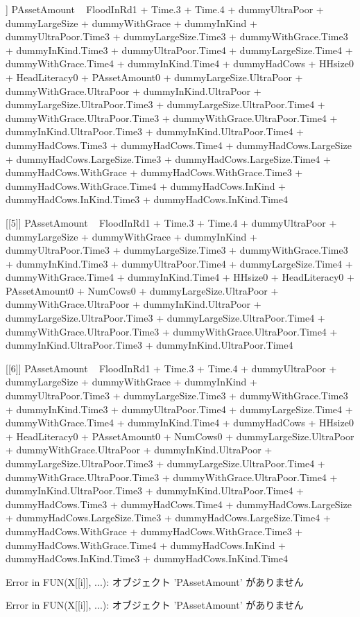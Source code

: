 \begin{Schunk}
\begin{Soutput}
[[4]]
PAssetAmount ~ FloodInRd1 + Time.3 + Time.4 + dummyUltraPoor + 
    dummyLargeSize + dummyWithGrace + dummyInKind + dummyUltraPoor.Time3 + 
    dummyLargeSize.Time3 + dummyWithGrace.Time3 + dummyInKind.Time3 + 
    dummyUltraPoor.Time4 + dummyLargeSize.Time4 + dummyWithGrace.Time4 + 
    dummyInKind.Time4 + dummyHadCows + HHsize0 + HeadLiteracy0 + 
    PAssetAmount0 + dummyLargeSize.UltraPoor + dummyWithGrace.UltraPoor + 
    dummyInKind.UltraPoor + dummyLargeSize.UltraPoor.Time3 + 
    dummyLargeSize.UltraPoor.Time4 + dummyWithGrace.UltraPoor.Time3 + 
    dummyWithGrace.UltraPoor.Time4 + dummyInKind.UltraPoor.Time3 + 
    dummyInKind.UltraPoor.Time4 + dummyHadCows.Time3 + dummyHadCows.Time4 + 
    dummyHadCows.LargeSize + dummyHadCows.LargeSize.Time3 + dummyHadCows.LargeSize.Time4 + 
    dummyHadCows.WithGrace + dummyHadCows.WithGrace.Time3 + dummyHadCows.WithGrace.Time4 + 
    dummyHadCows.InKind + dummyHadCows.InKind.Time3 + dummyHadCows.InKind.Time4

[[5]]
PAssetAmount ~ FloodInRd1 + Time.3 + Time.4 + dummyUltraPoor + 
    dummyLargeSize + dummyWithGrace + dummyInKind + dummyUltraPoor.Time3 + 
    dummyLargeSize.Time3 + dummyWithGrace.Time3 + dummyInKind.Time3 + 
    dummyUltraPoor.Time4 + dummyLargeSize.Time4 + dummyWithGrace.Time4 + 
    dummyInKind.Time4 + HHsize0 + HeadLiteracy0 + PAssetAmount0 + 
    NumCows0 + dummyLargeSize.UltraPoor + dummyWithGrace.UltraPoor + 
    dummyInKind.UltraPoor + dummyLargeSize.UltraPoor.Time3 + 
    dummyLargeSize.UltraPoor.Time4 + dummyWithGrace.UltraPoor.Time3 + 
    dummyWithGrace.UltraPoor.Time4 + dummyInKind.UltraPoor.Time3 + 
    dummyInKind.UltraPoor.Time4

[[6]]
PAssetAmount ~ FloodInRd1 + Time.3 + Time.4 + dummyUltraPoor + 
    dummyLargeSize + dummyWithGrace + dummyInKind + dummyUltraPoor.Time3 + 
    dummyLargeSize.Time3 + dummyWithGrace.Time3 + dummyInKind.Time3 + 
    dummyUltraPoor.Time4 + dummyLargeSize.Time4 + dummyWithGrace.Time4 + 
    dummyInKind.Time4 + dummyHadCows + HHsize0 + HeadLiteracy0 + 
    PAssetAmount0 + NumCows0 + dummyLargeSize.UltraPoor + dummyWithGrace.UltraPoor + 
    dummyInKind.UltraPoor + dummyLargeSize.UltraPoor.Time3 + 
    dummyLargeSize.UltraPoor.Time4 + dummyWithGrace.UltraPoor.Time3 + 
    dummyWithGrace.UltraPoor.Time4 + dummyInKind.UltraPoor.Time3 + 
    dummyInKind.UltraPoor.Time4 + dummyHadCows.Time3 + dummyHadCows.Time4 + 
    dummyHadCows.LargeSize + dummyHadCows.LargeSize.Time3 + dummyHadCows.LargeSize.Time4 + 
    dummyHadCows.WithGrace + dummyHadCows.WithGrace.Time3 + dummyHadCows.WithGrace.Time4 + 
    dummyHadCows.InKind + dummyHadCows.InKind.Time3 + dummyHadCows.InKind.Time4
\end{Soutput}
\end{Schunk}
\begin{Schunk}
\begin{Soutput}
Error in FUN(X[[i]], ...):  オブジェクト 'PAssetAmount' がありません 
\end{Soutput}
\begin{Soutput}
Error in FUN(X[[i]], ...):  オブジェクト 'PAssetAmount' がありません 
\end{Soutput}
\end{Schunk}


